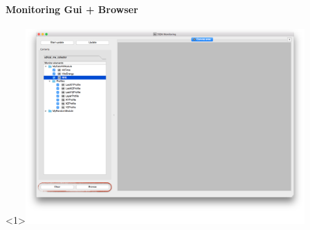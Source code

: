 \documentclass[8pt]{beamer}
\begin{document}
  
 \begin{frame}
    \frametitle{\secname}
    \framesubtitle{ Monitoring Gui + Browser }
    
    \begin{overlayarea}{\textwidth}{\textheight}
    	       \begin{center}

        \begin{onlyenv}<1>\includegraphics[width=0.8\textwidth]{figs/MonitoringGui/MG_Browse.png}\end{onlyenv}
                       \end{center}

       \begin{columns}
       
	 \vspace{-3em}


\end{columns}
\end{overlayarea}
\end{frame}
\end{document}
